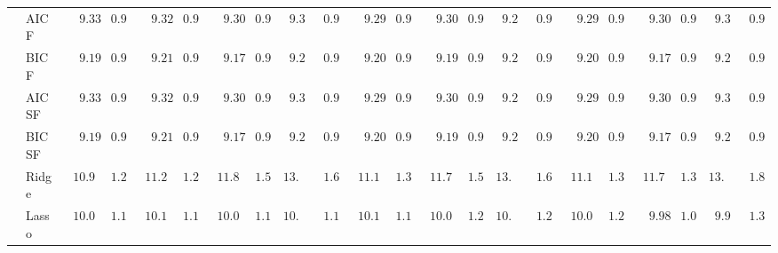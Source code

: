 \begin{tabular}{ll|ll|llllll|llllll|llllll}
 & AIC F  & $\phantom{00}9.33$ & $\phantom{0}0.97$ & $\phantom{00}9.32$ & $\phantom{0}0.98$ & $\phantom{00}9.30$ & $\phantom{0}0.96$ & $\phantom{0}9.33$ & $\phantom{0}0.98$ & $\phantom{00}9.29$ & $\phantom{0}0.96$ & $\phantom{00}9.30$ & $\phantom{0}0.97$ & $\phantom{0}9.29$ & $\phantom{0}0.97$ & $\phantom{00}9.29$ & $\phantom{0}0.96$ & $\phantom{00}9.30$ & $\phantom{0}0.95$ & $\phantom{0}9.30$ & $\phantom{0}0.96$ \\
 & BIC F  & $\phantom{00}9.19$ & $\phantom{0}0.94$ & $\phantom{00}9.21$ & $\phantom{0}0.96$ & $\phantom{00}9.17$ & $\phantom{0}0.95$ & $\phantom{0}9.25$ & $\phantom{0}0.95$ & $\phantom{00}9.20$ & $\phantom{0}0.92$ & $\phantom{00}9.19$ & $\phantom{0}0.94$ & $\phantom{0}9.28$ & $\phantom{0}0.91$ & $\phantom{00}9.20$ & $\phantom{0}0.95$ & $\phantom{00}9.17$ & $\phantom{0}0.92$ & $\phantom{0}9.25$ & $\phantom{0}0.98$ \\
 & AIC SF  & $\phantom{00}9.33$ & $\phantom{0}0.97$ & $\phantom{00}9.32$ & $\phantom{0}0.98$ & $\phantom{00}9.30$ & $\phantom{0}0.96$ & $\phantom{0}9.33$ & $\phantom{0}0.98$ & $\phantom{00}9.29$ & $\phantom{0}0.96$ & $\phantom{00}9.30$ & $\phantom{0}0.97$ & $\phantom{0}9.29$ & $\phantom{0}0.97$ & $\phantom{00}9.29$ & $\phantom{0}0.96$ & $\phantom{00}9.30$ & $\phantom{0}0.95$ & $\phantom{0}9.30$ & $\phantom{0}0.96$ \\
 & BIC SF  & $\phantom{00}9.19$ & $\phantom{0}0.94$ & $\phantom{00}9.21$ & $\phantom{0}0.96$ & $\phantom{00}9.17$ & $\phantom{0}0.95$ & $\phantom{0}9.25$ & $\phantom{0}0.95$ & $\phantom{00}9.20$ & $\phantom{0}0.92$ & $\phantom{00}9.19$ & $\phantom{0}0.94$ & $\phantom{0}9.27$ & $\phantom{0}0.91$ & $\phantom{00}9.20$ & $\phantom{0}0.95$ & $\phantom{00}9.17$ & $\phantom{0}0.92$ & $\phantom{0}9.25$ & $\phantom{0}0.98$ \\
 & Ridge  & $\phantom{0}10.91$ & $\phantom{0}1.25$ & $\phantom{0}11.23$ & $\phantom{0}1.26$ & $\phantom{0}11.85$ & $\phantom{0}1.50$ & $13.72$ & $\phantom{0}1.65$ & $\phantom{0}11.13$ & $\phantom{0}1.31$ & $\phantom{0}11.77$ & $\phantom{0}1.55$ & $13.21$ & $\phantom{0}1.60$ & $\phantom{0}11.12$ & $\phantom{0}1.34$ & $\phantom{0}11.77$ & $\phantom{0}1.38$ & $13.66$ & $\phantom{0}1.84$ \\
 & Lasso  & $\phantom{0}10.09$ & $\phantom{0}1.18$ & $\phantom{0}10.17$ & $\phantom{0}1.14$ & $\phantom{0}10.06$ & $\phantom{0}1.13$ & $10.07$ & $\phantom{0}1.19$ & $\phantom{0}10.10$ & $\phantom{0}1.15$ & $\phantom{0}10.06$ & $\phantom{0}1.24$ & $10.07$ & $\phantom{0}1.22$ & $\phantom{0}10.01$ & $\phantom{0}1.24$ & $\phantom{00}9.98$ & $\phantom{0}1.09$ & $\phantom{0}9.99$ & $\phantom{0}1.31$ \\

\end{tabular}
